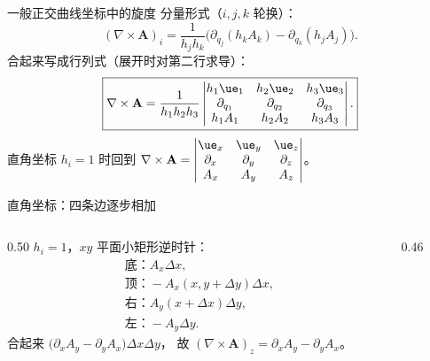 \documentclass[fontset=windows, chinese, 10pt, xcolor=dvipsnames]{beamer}
\begin{document}
\begin{frame}{一般正交曲线坐标中的旋度}
  分量形式（$i,j,k$ 轮换）：
  \begin{equation*}
    (\nabla\times\mathbf{A})_i
    =\frac{1}{h_j h_k}
      \bigl(\partial_{q_j}(h_k A_k)-\partial_{q_k}(h_j A_j)\bigr).
  \end{equation*}
  合起来写成行列式（展开时对第二行求导）：
  \begin{equation*}
    \boxed{\displaystyle
      \nabla\times\mathbf{A}
      =\frac{1}{h_1 h_2 h_3}
        \begin{vmatrix}
          h_1\ue_1 & h_2\ue_2 & h_3\ue_3 \\
          \partial_{q_1} & \partial_{q_2} & \partial_{q_3} \\
          h_1 A_1 & h_2 A_2 & h_3 A_3
        \end{vmatrix}.}
  \end{equation*}
  直角坐标 $h_i=1$ 时回到
  $\nabla\times\mathbf{A}
  =\begin{vmatrix}
  \ue_x&\ue_y&\ue_z\\
  \partial_x&\partial_y&\partial_z\\
  A_x&A_y&A_z
  \end{vmatrix}$。
\end{frame}

\begin{frame}{直角坐标：四条边逐步相加}
  \begin{columns}[c]
    \begin{column}{0.50\textwidth}
      $h_i=1$，$xy$ 平面小矩形逆时针：
      \begin{align*}
        &\text{底：}A_x\Delta x,\\
        &\text{顶：}-A_x(x,y+\Delta y)\Delta x,\\
        &\text{右：}A_y(x+\Delta x)\Delta y,\\
        &\text{左：}-A_y\Delta y.
      \end{align*}
      合起来
      $\bigl(\partial_x A_y-\partial_y A_x\bigr)\Delta x\Delta y$，
      故 $(\nabla\times\mathbf{A})_z=\partial_x A_y-\partial_y A_x$。
    \end{column}
    \begin{column}{0.46\textwidth}
      \centering
      
    \end{column}
  \end{columns}
\end{frame}
\end{document}
